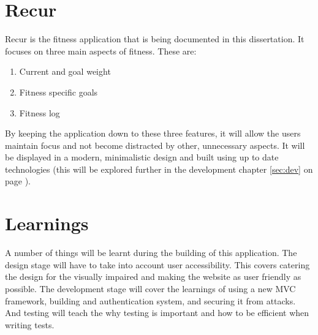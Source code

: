 \section{Recur}
Recur is the fitness application that is being documented in this dissertation. It focuses on three main aspects of fitness. These are:

\begin{enumerate}
\item {Current and goal weight}
\item {Fitness specific goals}
\item {Fitness log}
\end{enumerate}

\noindent
By keeping the application down to these three features, it will allow the users maintain focus and not become distracted by other, unnecessary aspects. It will be displayed in a modern, minimalistic design and built using up to date technologies (this will be explored further in the development chapter \ref{sec:dev} on page \pageref{sec:dev}).\\

\section{Learnings}
A number of things will be learnt during the building of this application. The design stage will have to take into account user accessibility. This covers catering the design for the visually impaired and making the website as user friendly as possible. The development stage will cover the learnings of using a new MVC framework, building and authentication system, and securing it from attacks. And testing will teach the why testing is important and how to be efficient when writing tests.\\

